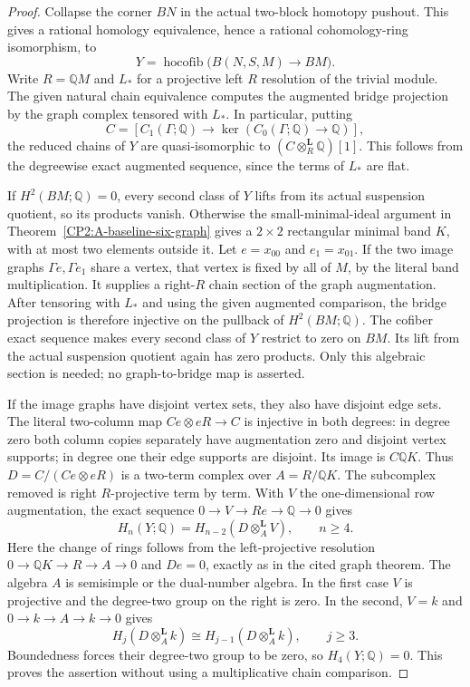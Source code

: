 \begin{proof}
Collapse the corner $BN$ in the actual two-block homotopy
pushout.  This gives a rational homology equivalence,
hence a rational cohomology-ring isomorphism, to
\[
 Y=\operatorname{hocofib}\bigl(B(N,S,M)\longrightarrow BM\bigr).
\]
Write $R=\mathbb QM$ and $L_*$ for a projective left
$R$ resolution of the trivial module.  The given natural
chain equivalence computes the augmented bridge projection
by the graph complex tensored with $L_*$.  In particular,
putting
\[
 C=[C_1(\Gamma;\mathbb Q)\longrightarrow
             \ker(C_0(\Gamma;\mathbb Q)\to\mathbb Q)],
\]
the reduced chains of $Y$ are quasi-isomorphic to
$(C\otimes_R^{\mathbf L}\mathbb Q)[1]$.  This follows
from the degreewise exact augmented sequence, since
the terms of $L_*$ are flat.

If $H^2(BM;\mathbb Q)=0$, every second class of $Y$
lifts from its actual suspension quotient, so its
products vanish.  Otherwise the small-minimal-ideal
argument in Theorem~\ref{CP2:A-baseline-six-graph} gives
a $2\times2$ rectangular minimal band $K$, with at most
two elements outside it.  Let $e=x_{00}$ and $e_1=x_{01}$.
If the two image graphs $\Gamma e,\Gamma e_1$ share a
vertex, that vertex is fixed by all of $M$, by the
literal band multiplication.  It supplies a right-$R$
chain section of the graph augmentation.  After tensoring
with $L_*$ and using the given augmented comparison,
the bridge projection is therefore injective on the
pullback of $H^2(BM;\mathbb Q)$.  The cofiber exact
sequence makes every second class of $Y$ restrict to
zero on $BM$.  Its lift from the actual suspension
quotient again has zero products.  Only this algebraic
section is needed; no graph-to-bridge map is asserted.

If the image graphs have disjoint vertex sets, they
also have disjoint edge sets.  The literal two-column
map $Ce\otimes eR\to C$ is injective in both degrees:
in degree zero both column copies separately have
augmentation zero and disjoint vertex supports; in
degree one their edge supports are disjoint.  Its
image is $C\mathbb QK$.  Thus
$D=C/(Ce\otimes eR)$ is a two-term complex over
$A=R/\mathbb QK$.  The subcomplex removed is right
$R$-projective term by term.  With $V$ the one-dimensional
row augmentation, the exact sequence
$0\to V\to Re\to\mathbb Q\to0$ gives
\[
 H_n(Y;\mathbb Q)
   =H_{n-2}(D\otimes_A^{\mathbf L}V),\qquad n\ge4.
\]
Here the change of rings follows from the left-projective
resolution $0\to\mathbb QK\to R\to A\to0$ and
$De=0$, exactly as in the cited graph theorem.
The algebra $A$ is semisimple or the dual-number algebra.
In the first case $V$ is projective and the degree-two
group on the right is zero.  In the second, $V=k$ and
$0\to k\to A\to k\to0$ gives
\[
 H_j(D\otimes_A^{\mathbf L}k)
   \cong H_{j-1}(D\otimes_A^{\mathbf L}k),\qquad j\ge3.
\]
Boundedness forces their degree-two group to be zero,
so $H_4(Y;\mathbb Q)=0$.  This proves the assertion
without using a multiplicative chain comparison.
\end{proof}

